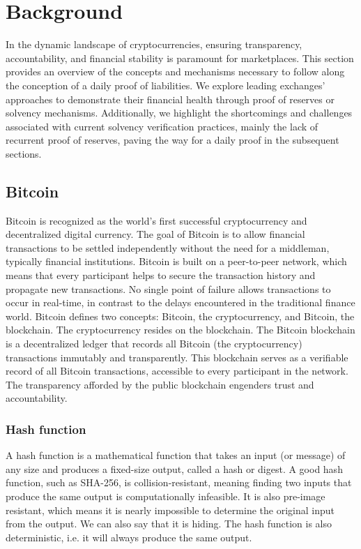 

\chapter{Background}


In the dynamic landscape of cryptocurrencies, ensuring transparency, accountability, and financial stability
is paramount for marketplaces. This section provides an overview of the concepts and mechanisms
necessary to follow along the conception of a daily proof of liabilities. We explore leading exchanges' approaches
to demonstrate their financial health through proof of reserves or solvency mechanisms. Additionally, we
highlight the shortcomings and challenges associated with current solvency verification practices, mainly the lack of recurrent proof of reserves,
paving the way for a daily proof in the subsequent sections.




\section{Bitcoin}
Bitcoin is recognized as the world's first successful cryptocurrency and decentralized digital currency.
The goal of Bitcoin is to allow financial transactions to be settled independently without the need for a middleman, typically financial institutions.
Bitcoin is built on a peer-to-peer network, which means that every participant helps to secure the transaction history and propagate new transactions.
No single point of failure allows transactions to occur in real-time, in contrast to the delays encountered in the traditional finance world. \cite{MB17}
Bitcoin defines two concepts: Bitcoin, the cryptocurrency, and Bitcoin, the blockchain. The cryptocurrency resides on the blockchain.
The Bitcoin blockchain is a decentralized ledger that records all Bitcoin (the cryptocurrency) transactions immutably and transparently.
This blockchain serves as a verifiable record of all Bitcoin transactions, accessible to every participant in the network.
The transparency afforded by the public blockchain engenders trust and accountability. 

\subsection{Hash function}
A hash function is a mathematical function that takes an input (or message) of any size and produces a fixed-size output, called a hash or digest.
A good hash function, such as SHA-256, is collision-resistant, meaning finding two inputs that produce the same output is computationally infeasible. 
It is also pre-image resistant, which means it is nearly impossible to determine the original input from the output. We can also say that it is hiding.
The hash function is also deterministic, i.e. it will always produce the same output.


